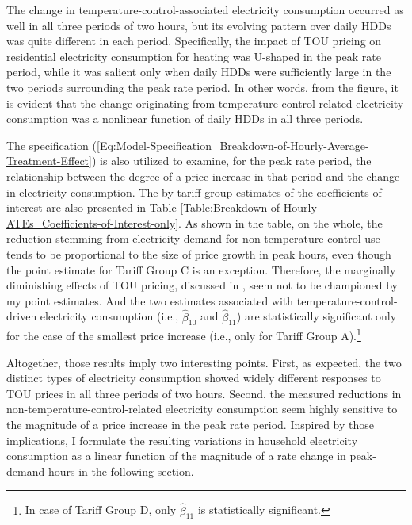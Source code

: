 The change in temperature-control-associated electricity consumption occurred as well in all three periods of two hours, but its evolving pattern over daily HDDs was quite different in each period. Specifically, the impact of TOU pricing on residential electricity consumption for heating was U-shaped in the peak rate period, while it was salient only when daily HDDs were sufficiently large in the two periods surrounding the peak rate period. In other words, from the figure, it is evident that the change originating from temperature-control-related electricity consumption was a nonlinear function of daily HDDs in all three periods.

The specification (\ref{Eq:Model-Specification_Breakdown-of-Hourly-Average-Treatment-Effect}) is also utilized to examine, for the peak rate period, the relationship between the degree of a price increase in that period and the change in electricity consumption. The by-tariff-group estimates of the coefficients of interest are also presented in Table \ref{Table:Breakdown-of-Hourly-ATEs_Coefficients-of-Interest-only}. As shown in the table, on the whole, the reduction stemming from electricity demand for non-temperature-control use tends to be proportional to the size of price growth in peak hours, even though the point estimate for Tariff Group C is an exception. Therefore, the marginally diminishing effects of TOU pricing, discussed in \cite{Peaking-Interest:How-Awareness-Drives-the-Effectiveness-of-Time-of-Use-Electricity-Pricing_Prest_2020}, seem not to be championed by my point estimates. And the two estimates associated with temperature-control-driven electricity consumption (i.e., $\hat{\beta}_{10}$ and $\hat{\beta}_{11}$) are statistically significant only for the case of the smallest price increase (i.e., only for Tariff Group A).\footnote{In case of Tariff Group D, only $\hat{\beta}_{11}$ is statistically significant.} 

Altogether, those results imply two interesting points. First, as expected, the two distinct types of electricity consumption showed widely different responses to TOU prices in all three periods of two hours. Second, the measured reductions in non-temperature-control-related electricity consumption seem highly sensitive to the magnitude of a price increase in the peak rate period. Inspired by those implications, I formulate the resulting variations in household electricity consumption as a linear function of the magnitude of a rate change in peak-demand hours in the following section.
